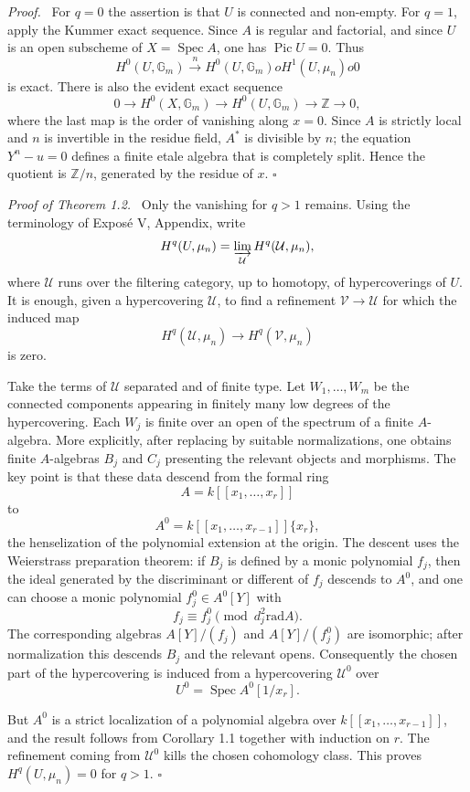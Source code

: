 \documentclass[12pt]{article}
\newcommand{\Uu}{\mathcal U}
\newcommand{\Vv}{\mathcal V}
\newcommand{\ZZ}{\mathbb Z}
\newcommand{\GG}{\mathbb G}
\DeclareMathOperator{\Spec}{Spec}
\DeclareMathOperator{\Pic}{Pic}
\newcommand{\rad}{\mathrm{rad}}
\newcommand{\qedtext}{\hfill\(\square\)}
\newenvironment{prooftext}[1][Proof]{\par\noindent\emph{#1.}\ }{\par\medskip}
\begin{document}
\begin{prooftext}
For $q=0$ the assertion is that $U$ is connected and non-empty. For $q=1$, apply the Kummer exact sequence. Since $A$ is regular and factorial, and since $U$ is an open subscheme of $X=\Spec A$, one has $\Pic U=0$. Thus
\[
   H^0(U,\GG_m)\xrightarrow{n}H^0(U,\GG_m)	o H^1(U,\mu_n)	o 0
\]
is exact. There is also the evident exact sequence
\[
0\to H^0(X,\GG_m)\to H^0(U,\GG_m)\to \ZZ\to 0,
\]
where the last map is the order of vanishing along $x=0$. Since $A$ is strictly local and $n$ is invertible in the residue field, $A^*$ is divisible by $n$; the equation $Y^n-u=0$ defines a finite etale algebra that is completely split. Hence the quotient is $\ZZ/n$, generated by the residue of $x$. \qedtext
\end{prooftext}

\begin{prooftext}[Proof of Theorem 1.2]
Only the vanishing for $q>1$ remains. Using the terminology of Expos\'e V, Appendix, write
\[
   H^q(U,\mu_n)=\varinjlim_{\Uu}H^q(\Uu,\mu_n),
\]
where $\Uu$ runs over the filtering category, up to homotopy, of hypercoverings of $U$. It is enough, given a hypercovering $\Uu$, to find a refinement $\Vv\to\Uu$ for which the induced map
\[
   H^q(\Uu,\mu_n)\longrightarrow H^q(\Vv,\mu_n)
\]
is zero.

Take the terms of $\Uu$ separated and of finite type. Let $W_1,\ldots,W_m$ be the connected components appearing in finitely many low degrees of the hypercovering. Each $W_j$ is finite over an open of the spectrum of a finite $A$-algebra. More explicitly, after replacing by suitable normalizations, one obtains finite $A$-algebras $B_j$ and $C_j$ presenting the relevant objects and morphisms. The key point is that these data descend from the formal ring
\[
   A=k[[x_1,\ldots,x_r]]
\]
to
\[
   A^0=k[[x_1,\ldots,x_{r-1}]]\{x_r\},
\]
the henselization of the polynomial extension at the origin. The descent uses the Weierstrass preparation theorem: if $B_j$ is defined by a monic polynomial $f_j$, then the ideal generated by the discriminant or different of $f_j$ descends to $A^0$, and one can choose a monic polynomial $f^0_j\in A^0[Y]$ with
\[
   f_j\equiv f^0_j\pmod{d_j^2\rad A}.
\]
The corresponding algebras $A[Y]/(f_j)$ and $A[Y]/(f^0_j)$ are isomorphic; after normalization this descends $B_j$ and the relevant opens. Consequently the chosen part of the hypercovering is induced from a hypercovering $\Uu^0$ over
\[
   U^0=\Spec A^0[1/x_r].
\]

But $A^0$ is a strict localization of a polynomial algebra over $k[[x_1,\ldots,x_{r-1}]]$, and the result follows from Corollary 1.1 together with induction on $r$. The refinement coming from $\Uu^0$ kills the chosen cohomology class. This proves $H^q(U,\mu_n)=0$ for $q>1$. \qedtext
\end{prooftext}
\end{document}

